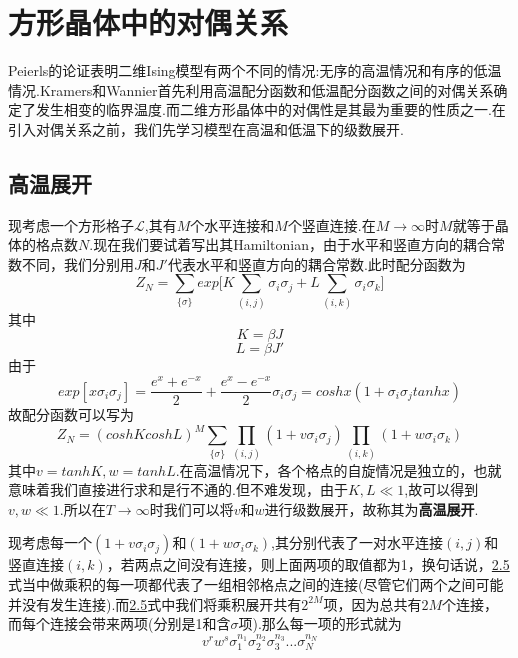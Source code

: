 \documentclass[a4paper]{book}
\begin{document}
\chapter{方形晶体中的对偶关系}
Peierls的论证表明二维Ising模型有两个不同的情况:无序的高温情况和有序的低温情况.Kramers和Wannier首先利用高温配分函数和低温配分函数之间的对偶关系确定了发生相变的临界温度.而二维方形晶体中的对偶性是其最为重要的性质之一.在引入对偶关系之前，我们先学习模型在高温和低温下的级数展开.
\section{高温展开}
现考虑一个方形格子$\mathcal{L}$,其有$M$个水平连接和$M$个竖直连接.在$M\rightarrow\infty$时$M$就等于晶体的格点数$N$.现在我们要试着写出其Hamiltonian，由于水平和竖直方向的耦合常数不同，我们分别用$J$和$J'$代表水平和竖直方向的耦合常数.此时配分函数为
\begin{equation}\label{2.1}
	Z_N=\sum_{\{\sigma\}}exp\Big[K\sum_{(i,j)}\sigma_i\sigma_j+L\sum_{(i,k)}\sigma_i\sigma_k\Big]
\end{equation}
其中
\begin{equation}
	K=\beta J
\end{equation}
\begin{equation}
	L=\beta J'
\end{equation}
由于
\begin{equation}
	exp[x\sigma_i\sigma_j]=\frac{e^x+e^{-x}}{2}+\frac{e^x-e^{-x}}{2}\sigma_i\sigma_j=coshx(1+\sigma_i\sigma_jtanhx)
\end{equation}
故配分函数可以写为
\begin{equation}\label{2.5}
	Z_N=(coshKcoshL)^M\sum_{\{\sigma\}}\prod_{(i,j)}(1+v\sigma_i\sigma_j)\prod_{(i,k)}(1+w\sigma_i\sigma_k)
\end{equation}
其中$v=tanhK,w=tanhL$.在高温情况下，各个格点的自旋情况是独立的，也就意味着我们直接进行求和是行不通的.但不难发现，由于$K,L\ll1$,故可以得到$v,w\ll1$.所以在$T\rightarrow\infty$时我们可以将$v$和$w$进行级数展开，故称其为\textbf{高温展开}.\par 
现考虑每一个$(1+v\sigma_i\sigma_j)$和$(1+w\sigma_i\sigma_k)$,其分别代表了一对水平连接$(i,j)$和竖直连接$(i,k)$，若两点之间没有连接，则上面两项的取值都为1，换句话说，\hyperref[2.5]{2.5}式当中做乘积的每一项都代表了一组相邻格点之间的连接(尽管它们两个之间可能并没有发生连接).而\hyperref[2.5]{2.5}式中我们将乘积展开共有$2^{2M}$项，因为总共有$2M$个连接，而每个连接会带来两项(分别是1和含$\sigma$项).那么每一项的形式就为
\begin{equation}\label{2.6}
	v^rw^s\sigma_1^{n_1}\sigma_2^{n_2}\sigma_3^{n_3}...\sigma_N^{n_N}
\end{equation}
\end{document}
